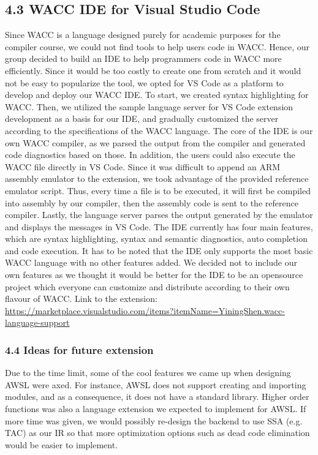 \documentclass[10pt,a4paper,]{report}
\begin{document}
  \subsection*{4.3 WACC IDE for Visual Studio Code}
  Since WACC is a language designed purely for academic purposes for the
  compiler course, we could not find tools to help users code in WACC. Hence, 
  our group decided to build an IDE to help programmers code in WACC more
  efficiently. Since it would be too costly to create one from scratch and 
  it would not be easy to popularize the tool, we opted for VS Code as a platform
  to develop and deploy our WACC IDE. To start, we created syntax highlighting
  for WACC. Then, we utilized the sample language server for VS Code extension
  development as a basis for our IDE, and gradually customized the server
  according to the specifications of the WACC language. The core of the IDE is
  our own WACC compiler, as we parsed the output from the compiler and generated
  code diagnostics based on those. In addition, the users could also execute the
  WACC file directly in VS Code. Since it was difficult to append an ARM
  assembly emulator to the extension, we took advantage of the provided
  reference emulator script. Thus, every time a file is to be executed, 
  it will first be compiled into assembly by our compiler, then the assembly
  code is sent to the reference compiler. Lastly, the language server parses the 
  output generated by the emulator and displays the messages in VS Code. The IDE
  currently has four main features, which are syntax highlighting, syntax and
  semantic diagnostics, auto completion and code execution. It has to be noted
  that the IDE only supports the most basic WACC language with no other features
  added. We decided not to include our own features as we thought it would be
  better for the IDE to be an opensource project which everyone can customize
  and distribute according to their own flavour of WACC. Link to the extension: 
  \url{https://marketplace.visualstudio.com/items?itemName=YiningShen.wacc-language-support}

  \subsubsection*{4.4 Ideas for future extension}
  Due to the time limit, some of the cool features we came up when designing
  AWSL were axed. For instance, AWSL does not support creating and importing
  modules, and as a consequence, it does not have a standard library. Higher
  order functions was also a language extension we expected to implement for
  AWSL. If more time was given, we would possibly re-design the backend to use
  SSA (e.g. TAC) as our IR so that more optimization options such as dead code
  elimination would be easier to implement.
\end{document}
